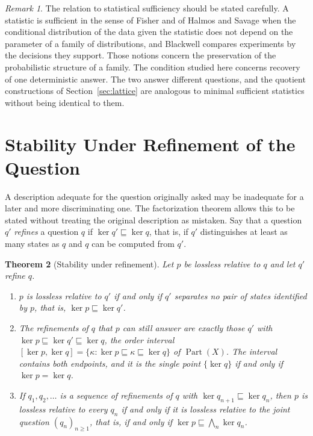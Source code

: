 \documentclass[11pt]{article}
\newtheorem{theorem}{Theorem}[section]
\theoremstyle{definition}
\theoremstyle{remark}
\newtheorem{remark}[theorem]{Remark}
\newcommand{\Part}{\operatorname{Part}}
\newcommand{\refines}{\sqsubseteq}
\newcommand{\bigmeet}{\bigwedge}
\begin{document}
\begin{remark}
The relation to statistical sufficiency should be stated carefully. A statistic is sufficient in the sense of Fisher \cite{fisher} and of Halmos and Savage \cite{halmos} when the conditional distribution of the data given the statistic does not depend on the parameter of a family of distributions, and Blackwell \cite{blackwell} compares experiments by the decisions they support. Those notions concern the preservation of the probabilistic structure of a family. The condition studied here concerns recovery of one deterministic answer. The two answer different questions, and the quotient constructions of Section~\ref{sec:lattice} are analogous to minimal sufficient statistics \cite{lehmann} without being identical to them.
\end{remark}

\section{Stability Under Refinement of the Question}\label{sec:refinement}

A description adequate for the question originally asked may be inadequate for a later and more discriminating one. The factorization theorem allows this to be stated without treating the original description as mistaken. Say that a question $q'$ \emph{refines} a question $q$ if $\ker q'\refines\ker q$, that is, if $q'$ distinguishes at least as many states as $q$ and $q$ can be computed from $q'$.

\begin{theorem}[Stability under refinement]\label{thm:refinement}
Let $p$ be lossless relative to $q$ and let $q'$ refine $q$.
\begin{enumerate}
\item[\textup{(a)}] $p$ is lossless relative to $q'$ if and only if $q'$ separates no pair of states identified by $p$, that is, $\ker p\refines\ker q'$.
\item[\textup{(b)}] The refinements of $q$ that $p$ can still answer are exactly those $q'$ with $\ker p\refines\ker q'\refines\ker q$, the order interval $[\ker p,\ker q]=\{\kappa:\ker p\refines\kappa\refines\ker q\}$ of $\Part(X)$. The interval contains both endpoints, and it is the single point $\{\ker q\}$ if and only if $\ker p=\ker q$.
\item[\textup{(c)}] If $q_1,q_2,\ldots$ is a sequence of refinements of $q$ with $\ker q_{n+1}\refines\ker q_n$, then $p$ is lossless relative to every $q_n$ if and only if it is lossless relative to the joint question $(q_n)_{n\ge1}$, that is, if and only if $\ker p\refines\bigmeet_n\ker q_n$.
\end{enumerate}
\end{theorem}
\end{document}
